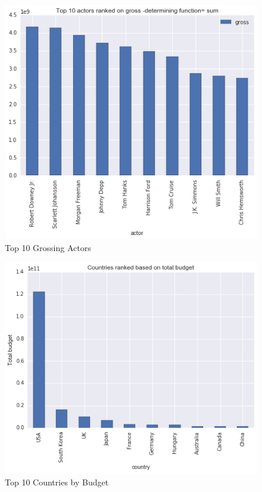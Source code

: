 \documentclass{article}%
\begin{document}
\begin{figure}
\centering
\includegraphics[width=1.0\columnwidth]{Fig/Top10actorsbasedongross.png}
\caption{Top 10 Grossing Actors}
\label{fig:Top10actorsbasedongross}
\end{figure}

\begin{figure}
\centering
\includegraphics[width=1.0\columnwidth]{Fig/Countriesrankedontotalbudgetformovies.png}
\caption{Top 10 Countries by Budget}
\label{fig:Countriesrankedontotalbudgetformovies}
\end{figure}
\end{document}
